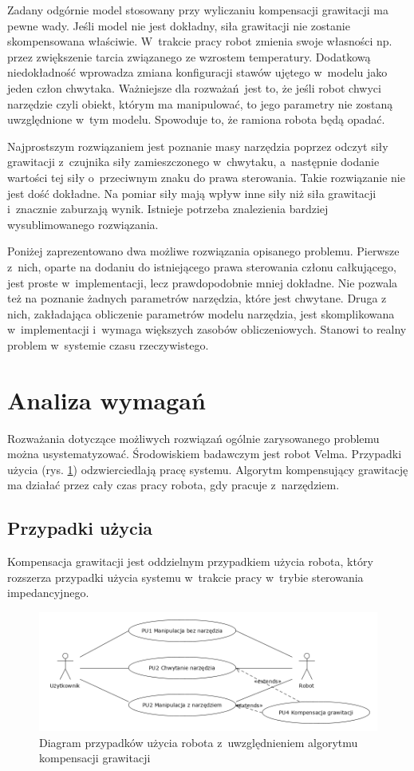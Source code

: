 Zadany odgórnie model stosowany przy wyliczaniu kompensacji grawitacji ma pewne wady. Jeśli model nie jest dokładny, siła grawitacji nie zostanie skompensowana właściwie. W~trakcie pracy robot zmienia swoje własności np. przez zwiększenie tarcia związanego ze wzrostem temperatury. Dodatkową niedokładność wprowadza zmiana konfiguracji stawów ujętego w~modelu jako jeden człon chwytaka.  Ważniejsze dla rozważań jest to, że jeśli robot chwyci narzędzie czyli obiekt, którym ma manipulować, to jego parametry nie zostaną uwzględnione w~tym modelu. Spowoduje to, że ramiona robota będą opadać.

Najprostszym rozwiązaniem jest poznanie masy narzędzia poprzez odczyt siły grawitacji z~czujnika siły zamieszczonego w~chwytaku, a~następnie dodanie wartości tej siły o~przeciwnym znaku do prawa sterowania. Takie rozwiązanie nie jest dość dokładne. Na pomiar siły mają wpływ inne siły niż siła grawitacji i~znacznie zaburzają wynik. Istnieje potrzeba znalezienia bardziej wysublimowanego rozwiązania.

Poniżej zaprezentowano dwa możliwe rozwiązania opisanego problemu. Pierwsze z~nich, oparte na dodaniu do istniejącego prawa sterowania członu całkującego, jest proste w~implementacji, lecz prawdopodobnie mniej dokładne. Nie pozwala też na poznanie żadnych parametrów narzędzia, które jest chwytane. Druga z nich, zakładająca obliczenie parametrów modelu narzędzia, jest skomplikowana w~implementacji i~wymaga większych zasobów obliczeniowych. Stanowi to realny problem w~systemie czasu rzeczywistego. 


\section{Analiza wymagań}
Rozważania dotyczące możliwych rozwiązań ogólnie zarysowanego problemu można usystematyzować. Środowiskiem badawczym jest robot Velma. Przypadki użycia (rys. \ref{fig:usecase}) odzwierciedlają pracę systemu. Algorytm kompensujący grawitację ma działać przez cały czas pracy robota, gdy pracuje z~narzędziem. 
\subsection{Przypadki użycia}
Kompensacja grawitacji jest oddzielnym przypadkiem  użycia robota, który rozszerza przypadki użycia systemu w~trakcie pracy w~trybie sterowania impedancyjnego.

\begin{figure}[H]
	\centering
	\includegraphics[width=.9\textwidth]{images/usecase.png}
	\caption{Diagram przypadków użycia robota z~uwzględnieniem algorytmu kompensacji grawitacji}
	\label{fig:usecase}
\end{figure}


